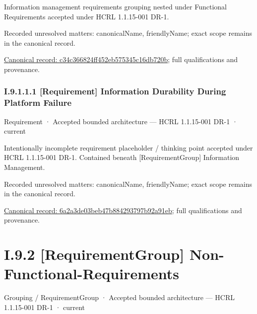 Information management requirements grouping nested under Functional Requirements accepted under HCRL 1.1.15-001 DR-1.


{\small Recorded unresolved matters: canonicalName, friendlyName; exact scope remains in the canonical record.}\par
{\footnotesize \href{../../../../../../../continuum/grouping/requirement-group/c34c366824ff452eb575345c16db720b.md}{Canonical record: c34c366824ff452eb575345c16db720b}; full qualifications and provenance.}\par
\subsubsection*{I.9.1.1.1 [Requirement] Information Durability During Platform Failure}
\label{navigation:I.9.1.1.1}

\label{element:6a2a3de03beb47b884293797b92a91eb}
{\small Requirement · Accepted bounded architecture — HCRL 1.1.15-001 DR-1 · current}\par

Intentionally incomplete requirement placeholder / thinking point accepted under HCRL 1.1.15-001 DR-1. Contained beneath [RequirementGroup] Information Management.


{\small Recorded unresolved matters: canonicalName, friendlyName; exact scope remains in the canonical record.}\par
{\footnotesize \href{../../../../../../../continuum/motivation/requirement/6a2a3de03beb47b884293797b92a91eb.md}{Canonical record: 6a2a3de03beb47b884293797b92a91eb}; full qualifications and provenance.}\par
\section*{I.9.2 [RequirementGroup] Non-Functional-Requirements}
\label{navigation:I.9.2}

\label{element:f4a3060eba464f4ab89b50aec4628e5b}
{\small Grouping / RequirementGroup · Accepted bounded architecture — HCRL 1.1.15-001 DR-1 · current}\par

